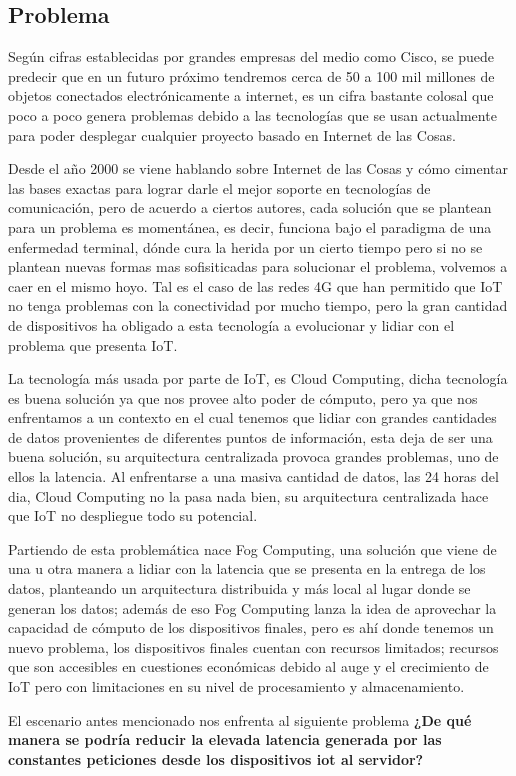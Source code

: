     \subsection{Problema}
        Según cifras establecidas por grandes empresas del medio como Cisco,  se puede predecir que en un futuro próximo tendremos cerca de 50 a 100 mil millones de objetos conectados electrónicamente a internet, es un cifra bastante colosal que poco a poco genera problemas debido a las tecnologías que se usan actualmente para poder desplegar cualquier proyecto basado en Internet de las Cosas.\par
        Desde el año 2000 se viene hablando sobre Internet de las Cosas y cómo cimentar las bases exactas para lograr darle el mejor soporte en tecnologías de comunicación, pero de acuerdo a ciertos autores, cada solución que se plantean para un problema es momentánea, es decir, funciona bajo el paradigma de una enfermedad terminal, dónde cura la herida por un cierto tiempo pero si no se plantean nuevas formas mas sofisiticadas para solucionar el problema, volvemos a caer en el mismo hoyo. Tal es el caso de las redes 4G que han permitido que IoT no tenga problemas con la conectividad por mucho tiempo, pero la gran cantidad de dispositivos ha obligado a esta tecnología a evolucionar y lidiar con el problema que presenta IoT.\par
        La tecnología más usada por parte de IoT, es Cloud Computing, dicha tecnología es buena solución ya que nos provee alto poder de cómputo, pero ya que nos enfrentamos a un contexto en el cual tenemos que lidiar con grandes cantidades de datos provenientes de diferentes puntos de información, esta deja de ser una buena solución,  su arquitectura centralizada provoca grandes problemas, uno de ellos la latencia. Al enfrentarse a una masiva cantidad de datos, las 24 horas del dia, Cloud Computing no la pasa nada bien, su arquitectura centralizada hace que IoT no despliegue todo su potencial. \par
        Partiendo de esta problemática nace Fog Computing, una solución que viene de una u otra manera  a lidiar con la latencia que se presenta en la entrega de los datos, planteando un arquitectura distribuida y más local al lugar donde se generan los datos; además de eso Fog Computing lanza la idea de aprovechar la capacidad de cómputo de los dispositivos finales, pero es ahí donde tenemos un nuevo problema, los dispositivos finales cuentan con recursos limitados; recursos que son accesibles en cuestiones económicas debido al auge y el crecimiento de IoT pero con limitaciones en su nivel de procesamiento y almacenamiento.\par
        El escenario antes mencionado nos enfrenta al siguiente problema {\bf¿De qué manera se podría reducir la elevada latencia generada por las constantes peticiones desde los dispositivos iot al servidor?}\par
